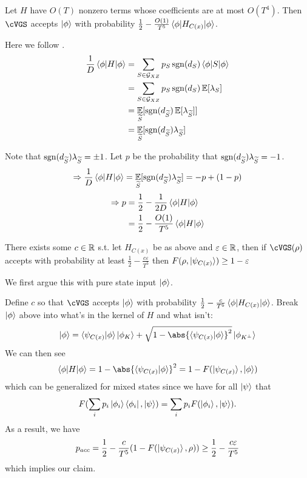 \begin{thm}
	\label{thm:HamCheck}
	Let $H$ have $O(T)$ nonzero terms whose coefficients are at most $O(T^4)$.
	Then $\cVGS$ accepts $\ket{\phi}$ with probability $\frac{1}{2}-\frac{O(1)}{T^5}\braket{\phi|H_{C(x)}|\phi}$.
\end{thm}
\begin{prf}
	Here we follow \cite{PhysRevA.93.022326}.
	\begin{align*}
		\frac{1}{D}\braket{\phi|H|\phi}&=\sum_{S\in\mathcal{G}_{XZ}} p_S\operatorname{sgn}(d_S)\braket{\phi|S|\phi}\\
		&=\sum_{S\in\mathcal{G}_{XZ}} p_S\operatorname{sgn}(d_S)\operatorname*{\mathbb{E}}[\lambda_S]\\
		&=\operatorname*{\mathbb{E}}_{\widetilde{S}}[\operatorname{sgn}(d_{\widetilde{S}})\operatorname*{\mathbb{E}}[\lambda_{\widetilde{S}}]]\\
		&=\operatorname*{\mathbb{E}}_{\widetilde{S}}[\operatorname{sgn}(d_{\widetilde{S}})\lambda_{\widetilde{S}}]
	\end{align*}

	Note that $\operatorname{sgn}(d_{\widetilde{S}})\lambda_{\widetilde{S}}=\pm1$. Let $p$ be the probability that $\operatorname{sgn}(d_{\widetilde{S}})\lambda_{\widetilde{S}}=-1$.
	$$\Rightarrow \frac{1}{D}\braket{\phi|H|\phi}=\operatorname*{\mathbb{E}}_{\widetilde{S}}[\operatorname{sgn}(d_{\widetilde{S}})\lambda_{\widetilde{S}}]=-p+(1-p)$$
	\begin{align*}
		\Rightarrow p&=\frac{1}{2}-\frac{1}{2D}\braket{\phi|H|\phi}\\
		&=\frac{1}{2}-\frac{O(1)}{T^5}\braket{\phi|H|\phi}
	\end{align*}
\end{prf}

\begin{cor}

	\label{cor:HamCheck}
	There exists some $c\in\mathbb{R}$ s.t.
	let $H_{C(x)}$ be as above and
	$\varepsilon\in\mathbb{R}$, then
	if $\cVGS(\rho)$ accepts with probability at least $\frac{1}{2}-\frac{c\varepsilon}{T^5}$
	then $F(\rho, \ket{\psi_{C(x)}})\geq1-\varepsilon$
\end{cor}
\begin{prf}
	We first argue this with pure state input $\ket\phi$.

	Define $c$ so that $\cVGS$ accepts $\ket{\phi}$ with probability $\frac{1}{2}-\frac{c}{T^5}\braket{\phi|H_{C(x)}|\phi}$.
	Break $\ket{\phi}$ above into what's in the kernel of $H$ and what isn't:
	$$\ket{\phi}=\braket{\psi_{C(x)}|\phi}\ket{\phi_K}+\sqrt{1-\abs{\braket{\psi_{C(x)}|\phi}}^2}\ket{\phi_{K^\bot}}$$
	We can then see
	$$\braket{\phi|H|\phi}=1-\abs{\braket{\psi_{C(x)}|\phi}}^2=1-F(\ket{\psi_{C(x)}}, \ket{\phi})$$
	which can be generalized for mixed states since we have for all $\ket\psi$ that
	$$F(\sum_i p_i \ket{\phi_i}\bra{\phi_i}, \ket\psi)=\sum_i p_i F(\ket{\phi_i}, \ket\psi).$$
	As a result, we have
	$$p_{acc}=\frac{1}{2}-\frac{c}{T^5}(1-F(\ket{\psi_{C(x)}}, \rho))\geq\frac{1}{2}-\frac{c\varepsilon}{T^5}$$
	which implies our claim.
\end{prf}


